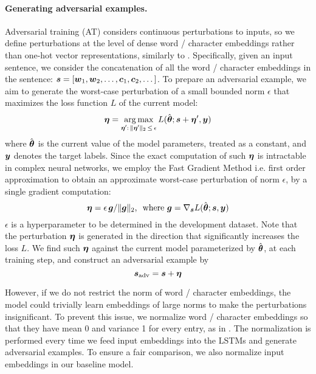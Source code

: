 \documentclass[11pt,a4paper]{article}
\DeclareMathOperator*{\argmax}{arg\,max}
\newcommand{\veci}[1]{\mbox{\boldmath $#1$}}
\begin{document}
\paragraph{Generating adversarial examples.}

Adversarial training (AT) considers continuous perturbations to inputs, so
we define perturbations at the level of dense word / character embeddings rather than one-hot vector representations, similarly to .
Specifically, given an input sentence,
we consider the concatenation of all the word \!/\! character embeddings in the sentence: 
$\veci{s} = [\veci{w}_1, \veci{w}_2, \dots, \veci{c}_1, \veci{c}_2, \dots]$.
To prepare an adversarial example, we aim to generate the worst-case perturbation of a small bounded norm $\epsilon$ that maximizes the loss function $L$ of the current model:
\begin{equation*}
\veci{\eta} = \argmax_{
\scalebox{0.75}{$\veci{\eta}'$}:\,
\Vert\scalebox{0.75}{$\veci{\eta}'$}\Vert_2\,
\leq \,\epsilon }
L(\hat{\veci{\theta}}; \veci{s}\!\!~ + \!\!~\veci{\eta}', \veci{y})
\end{equation*}
where $\hat{\veci{\theta}}$ is the current value of the model parameters, treated as a constant, and $\veci{y}$ denotes the target labels.
Since the exact computation of such $\veci{\eta}$ is intractable in complex neural networks, we employ the Fast Gradient Method \cite{liu2017delving,miyato2017adv} i.e. first order approximation to obtain an approximate worst-case perturbation of norm $\epsilon$, by a single gradient computation:\begin{equation}
\label{eq:perturb}
\veci{\eta} = \epsilon\, \veci{g}/ \Vert\veci{g}\Vert_2
\mbox{, ~where }  \veci{g} = \nabla_{\scalebox{0.8}{$\veci{s}$}} L(\hat{\veci{\theta}}; \veci{s}, \veci{y})
\end{equation}
$\epsilon$ is a hyperparameter to be determined in the development dataset.
Note that the perturbation $\veci{\eta}$ is generated in the direction that significantly increases the loss $L$.
We find such $\veci{\eta}$ against the current model parameterized by $\hat{\veci{\theta}}$, at each training step, and construct an adversarial example by\vspace{-1mm}
$$\veci{s}_{\mathrm{adv}} = \veci{s} + \veci{\eta} \vspace{-1.5mm}$$

However,
if we do not restrict the norm of word \!/\! character embeddings,
the model could trivially learn embeddings of large norms to make the perturbations insignificant.
To prevent this issue, we normalize word \!/\! character embeddings so that they have mean 0 and variance 1 for every entry, as in .
The normalization is performed  every time we feed input embeddings into the LSTMs and generate adversarial examples.
To ensure a fair comparison, we also normalize input embeddings in our baseline model.
\end{document}
